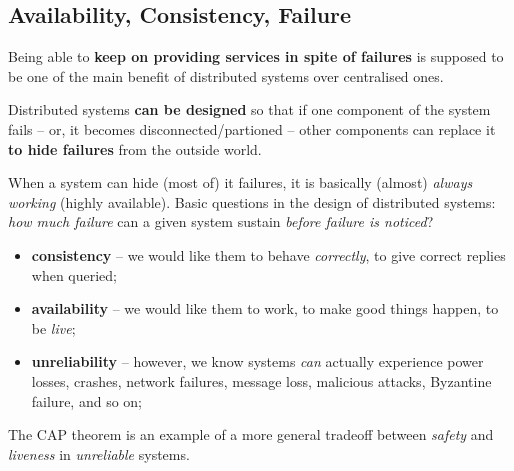 \documentclass[11pt, a4paper]{article}
\begin{document}
\subsection{Availability, Consistency, Failure}\label{sec:availability_consistency_failure} %
Being able to \textbf{keep on providing services in spite of failures} is supposed to be one of the main benefit of distributed systems over centralised ones.
\begin{note}
    Distributed systems \textbf{can be designed} so that if one component of the system fails -- or, it becomes disconnected/partioned -- other components can replace it \textbf{to hide failures} from the outside world.
\end{note}
When a system can hide (most of) it failures, it is basically (almost) \textit{always working} (highly available). Basic questions in the design of distributed systems: \textit{how much failure} can a given system sustain \textit{before failure is noticed}?
\\
\begin{note}
    \begin{itemize}
        \item \textbf{consistency} -- we would like them to behave \textit{correctly}, to give correct replies when queried;
        \item \textbf{availability} -- we would like them to work, to make good things happen, to be \textit{live};
        \item \textbf{unreliability} -- however, we know systems \textit{can} actually experience power losses, crashes, network failures, message loss, malicious attacks, Byzantine failure, and so on;
    \end{itemize}    
\end{note}
The CAP theorem is an example of a more general tradeoff between \textit{safety} and \textit{liveness} in \textit{unreliable} systems.
%
\end{document}
